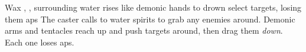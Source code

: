   {\mWater}%
  {Wax}%
  {\distant, \duplicated, \detailed}%
  {}%
  {surrounding water rises like demonic hands to drown select targets, losing them  \glspl{ap}}%
  {
    The caster calls to water spirits to grab any enemies around.
    Demonic arms and tentacles reach up and push targets around, then drag them \emph{down}.
    Each one loses  \glspl{ap}.
  }
